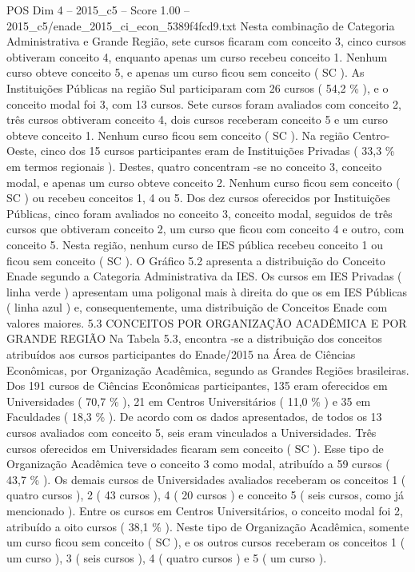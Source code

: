 \begin{textsample}{POS Dim 4 – 2015\_c5 – Score 1.00 – 2015\_c5/enade\_2015\_ci\_econ\_5389f4fcd9.txt}
Nesta combinação de Categoria Administrativa e Grande Região, sete cursos ficaram com conceito 3, cinco cursos obtiveram conceito 4, enquanto apenas um curso recebeu conceito 1.
Nenhum curso obteve conceito 5, e apenas um curso ficou sem conceito ( SC ).
As Instituições Públicas na região Sul participaram com 26 cursos ( 54,2 \% ), e o conceito modal foi 3, com 13 cursos.
Sete cursos foram avaliados com conceito 2, três cursos obtiveram conceito 4, dois cursos receberam conceito 5 e um curso obteve conceito 1.
Nenhum curso ficou sem conceito ( SC ).
Na região Centro-Oeste, cinco dos 15 cursos participantes eram de Instituições Privadas ( 33,3 \% em termos regionais ).
Destes, quatro concentram -se no conceito 3, conceito modal, e apenas um curso obteve conceito 2.
Nenhum curso ficou sem conceito ( SC ) ou recebeu conceitos 1, 4 ou 5.
Dos dez cursos oferecidos por Instituições Públicas, cinco foram avaliados no conceito 3, conceito modal, seguidos de três cursos que obtiveram conceito 2, um curso que ficou com conceito 4 e outro, com conceito 5.
Nesta região, nenhum curso de IES pública recebeu conceito 1 ou ficou sem conceito ( SC ).
O Gráfico 5.2 apresenta a distribuição do Conceito Enade segundo a Categoria Administrativa da IES.
Os cursos em IES Privadas ( linha verde ) apresentam uma poligonal mais à direita do que os em IES Públicas ( linha azul ) e, consequentemente, uma distribuição de Conceitos Enade com valores maiores. 5.3 CONCEITOS POR ORGANIZAÇÃO ACADÊMICA E POR GRANDE REGIÃO Na Tabela 5.3, encontra -se a distribuição dos conceitos atribuídos aos cursos participantes do Enade/2015 na Área de Ciências Econômicas, por Organização Acadêmica, segundo as Grandes Regiões brasileiras.
Dos 191 cursos de Ciências Econômicas participantes, 135 eram oferecidos em Universidades ( 70,7 \% ), 21 em Centros Universitários ( 11,0 \% ) e 35 em Faculdades ( 18,3 \% ).
De acordo com os dados apresentados, de todos os 13 cursos avaliados com conceito 5, seis eram vinculados a Universidades.
Três cursos oferecidos em Universidades ficaram sem conceito ( SC ).
Esse tipo de Organização Acadêmica teve o conceito 3 como modal, atribuído a 59 cursos ( 43,7 \% ).
Os demais cursos de Universidades avaliados receberam os conceitos 1 ( quatro cursos ), 2 ( 43 cursos ), 4 ( 20 cursos ) e conceito 5 ( seis cursos, como já mencionado ).
Entre os cursos em Centros Universitários, o conceito modal foi 2, atribuído a oito cursos ( 38,1 \% ).
Neste tipo de Organização Acadêmica, somente um curso ficou sem conceito ( SC ), e os outros cursos receberam os conceitos 1 ( um curso ), 3 ( seis cursos ), 4 ( quatro cursos ) e 5 ( um curso ).

\end{textsample}
